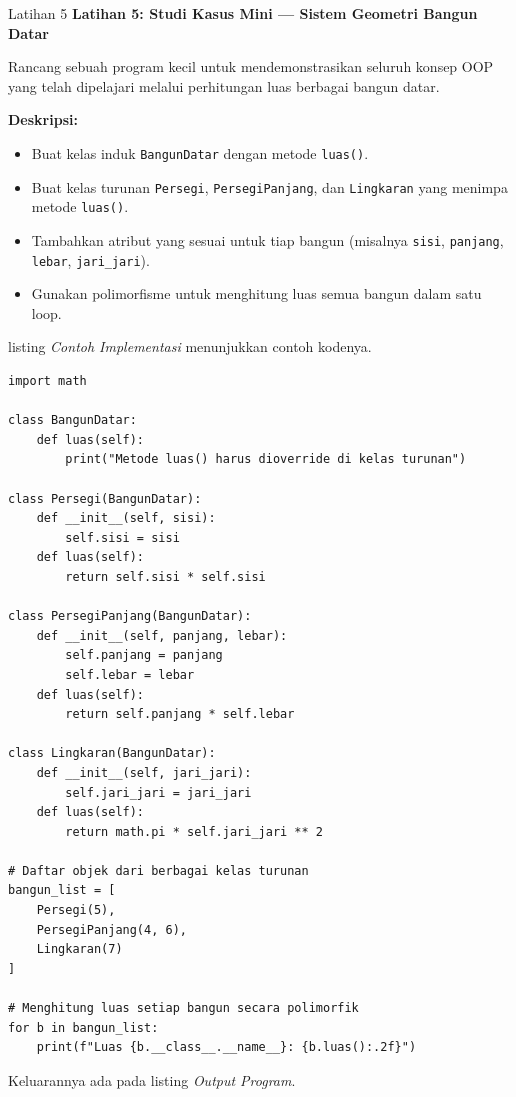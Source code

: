 \documentclass[aspectratio=169, table]{beamer}
\begin{document}
\begin{frame}[fragile,allowframebreaks=0.8]{Latihan 5}
\footnotesize
\textbf{Latihan 5: Studi Kasus Mini — Sistem Geometri Bangun Datar}\par\medskip
Rancang sebuah program kecil untuk mendemonstrasikan seluruh konsep OOP yang telah dipelajari melalui perhitungan luas berbagai bangun datar.

\textbf{Deskripsi:}
\begin{itemize}
    \item Buat kelas induk \texttt{BangunDatar} dengan metode \texttt{luas()}.
    \item Buat kelas turunan \texttt{Persegi}, \texttt{PersegiPanjang}, dan \texttt{Lingkaran} yang menimpa metode \texttt{luas()}.
    \item Tambahkan atribut yang sesuai untuk tiap bangun (misalnya \texttt{sisi}, \texttt{panjang}, \texttt{lebar}, \texttt{jari\_jari}).
    \item Gunakan polimorfisme untuk menghitung luas semua bangun dalam satu loop.
\end{itemize}

listing \textit{Contoh Implementasi} menunjukkan contoh kodenya.

\begin{lstlisting}[style=PythonStyle, breaklines=true]
import math

class BangunDatar:
    def luas(self):
        print("Metode luas() harus dioverride di kelas turunan")

class Persegi(BangunDatar):
    def __init__(self, sisi):
        self.sisi = sisi
    def luas(self):
        return self.sisi * self.sisi

class PersegiPanjang(BangunDatar):
    def __init__(self, panjang, lebar):
        self.panjang = panjang
        self.lebar = lebar
    def luas(self):
        return self.panjang * self.lebar

class Lingkaran(BangunDatar):
    def __init__(self, jari_jari):
        self.jari_jari = jari_jari
    def luas(self):
        return math.pi * self.jari_jari ** 2

# Daftar objek dari berbagai kelas turunan
bangun_list = [
    Persegi(5),
    PersegiPanjang(4, 6),
    Lingkaran(7)
]

# Menghitung luas setiap bangun secara polimorfik
for b in bangun_list:
    print(f"Luas {b.__class__.__name__}: {b.luas():.2f}")
\end{lstlisting}

Keluarannya ada pada listing \textit{Output Program}.


\end{frame}
\end{document}
